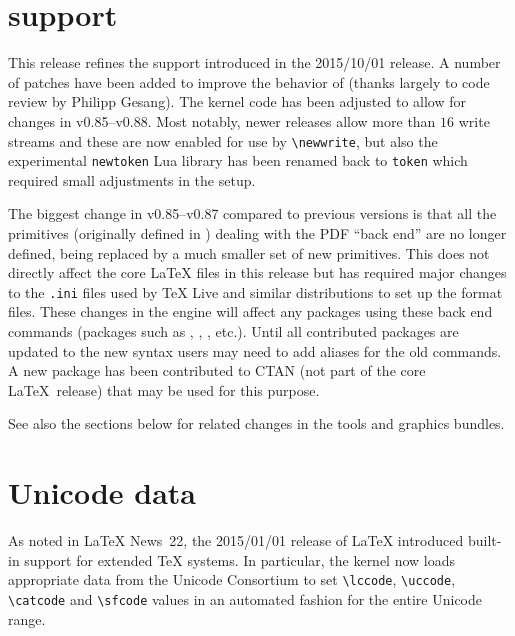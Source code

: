 \documentclass{ltnews}
\begin{document}
\maketitle

\tableofcontents

\section{ support}

This release refines the  support introduced in the
2015/10/01 release. A number of patches have been added to improve the
behavior of  (thanks largely to code review by Philipp Gesang).
The kernel code has been adjusted to
allow for changes in  v0.85--v0.88. Most notably, newer
 releases allow more than $16$ write streams and these are now
enabled for use by \verb|\newwrite|, but also the experimental
\texttt{newtoken} Lua library has been renamed back to \texttt{token}
which required small adjustments in the   setup.

The biggest change in   v0.85--v0.87 compared to previous
versions is that all the primitives (originally defined in
) dealing with the PDF ``back end''
are no longer defined, being replaced by a much smaller set of new primitives.
This does not directly affect the core \LaTeX{}
files in this release but has required major changes to the
\texttt{.ini} files used by \TeX{} Live and similar distributions to
set up the format files. These changes in the   engine
will affect any packages using these back end commands (packages such
as ,  ,  , etc.).
Until all contributed packages are updated to the new syntax users may
need to add aliases for the old  commands. A new
 package has been contributed to CTAN (not part of the
core \LaTeX\ release) that may be used for this purpose.

See also the sections below for related changes in the
\textsf{tools} and \textsf{graphics} bundles.


\section{Unicode data}

As noted in \LaTeX{} News~22, the 2015/01/01 release of \LaTeX{} introduced
built-in support for extended \TeX{} systems. In particular, the kernel now
loads appropriate data from the Unicode Consortium to set \verb|\lccode|,
\verb|\uccode|, \verb|\catcode| and \verb|\sfcode| values in an automated
fashion for the entire Unicode range.
\end{document}
